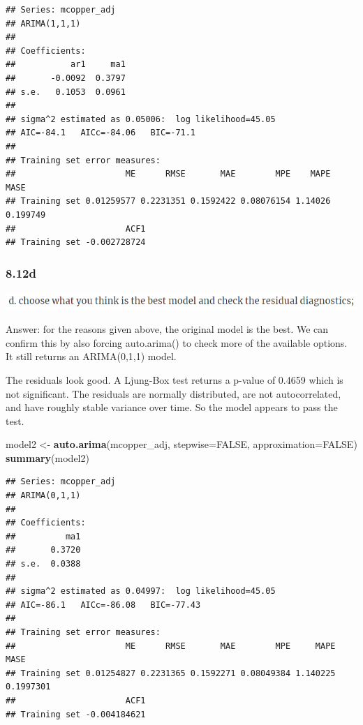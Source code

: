 \documentclass[]{book}
\newenvironment{Shaded}{\begin{snugshade}}{\end{snugshade}}
\newcommand{\DataTypeTok}[1]{\textcolor[rgb]{0.13,0.29,0.53}{#1}}
\newcommand{\KeywordTok}[1]{\textcolor[rgb]{0.13,0.29,0.53}{\textbf{#1}}}
\newcommand{\NormalTok}[1]{#1}
\newcommand{\OtherTok}[1]{\textcolor[rgb]{0.56,0.35,0.01}{#1}}
\newcommand{\StringTok}[1]{\textcolor[rgb]{0.31,0.60,0.02}{#1}}
\begin{document}
\begin{verbatim}
## Series: mcopper_adj 
## ARIMA(1,1,1) 
## 
## Coefficients:
##           ar1     ma1
##       -0.0092  0.3797
## s.e.   0.1053  0.0961
## 
## sigma^2 estimated as 0.05006:  log likelihood=45.05
## AIC=-84.1   AICc=-84.06   BIC=-71.1
## 
## Training set error measures:
##                      ME      RMSE       MAE        MPE    MAPE     MASE
## Training set 0.01259577 0.2231351 0.1592422 0.08076154 1.14026 0.199749
##                      ACF1
## Training set -0.002728724
\end{verbatim}

\hypertarget{d-5}{%
\subsubsection{8.12d}\label{d-5}}

\includegraphics{./week5/8.12d.png}

Answer: for the reasons given above, the original model is the best. We can confirm this by also forcing auto.arima() to check more of the available options. It still returns an ARIMA(0,1,1) model.

The residuals look good. A Ljung-Box test returns a p-value of 0.4659 which is not significant. The residuals are normally distributed, are not autocorrelated, and have roughly stable variance over time. So the model appears to pass the test.

\begin{Shaded}
\begin{Highlighting}[]
\NormalTok{model2 <-}\StringTok{ }\KeywordTok{auto.arima}\NormalTok{(mcopper_adj,  }\DataTypeTok{stepwise=}\OtherTok{FALSE}\NormalTok{, }\DataTypeTok{approximation=}\OtherTok{FALSE}\NormalTok{)}
\KeywordTok{summary}\NormalTok{(model2)}
\end{Highlighting}
\end{Shaded}

\begin{verbatim}
## Series: mcopper_adj 
## ARIMA(0,1,1) 
## 
## Coefficients:
##          ma1
##       0.3720
## s.e.  0.0388
## 
## sigma^2 estimated as 0.04997:  log likelihood=45.05
## AIC=-86.1   AICc=-86.08   BIC=-77.43
## 
## Training set error measures:
##                      ME      RMSE       MAE        MPE     MAPE      MASE
## Training set 0.01254827 0.2231365 0.1592271 0.08049384 1.140225 0.1997301
##                      ACF1
## Training set -0.004184621
\end{verbatim}
\end{document}

